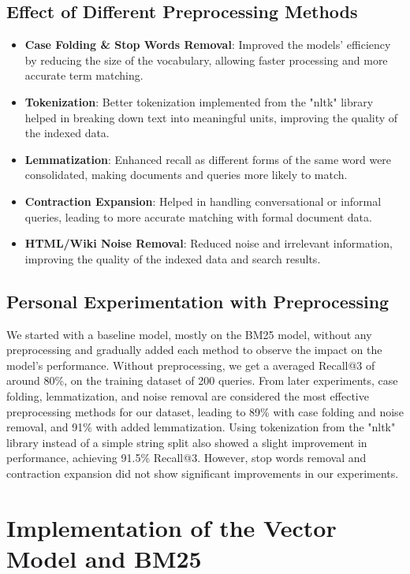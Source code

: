 \documentclass[12pt,letterpaper]{article}
\begin{document}
\subsection{Effect of Different Preprocessing Methods}
\begin{itemize}
    \item \textbf{Case Folding \& Stop Words Removal}: Improved the models' efficiency by reducing the size of the vocabulary, allowing faster processing and more accurate term matching.
    \item \textbf{Tokenization}: Better tokenization implemented from the "nltk" library helped in breaking down text into meaningful units, improving the quality of the indexed data.
    \item \textbf{Lemmatization}: Enhanced recall as different forms of the same word were consolidated, making documents and queries more likely to match.
    \item \textbf{Contraction Expansion}: Helped in handling conversational or informal queries, leading to more accurate matching with formal document data.
    \item \textbf{HTML/Wiki Noise Removal}: Reduced noise and irrelevant information, improving the quality of the indexed data and search results.
\end{itemize}

\subsection{Personal Experimentation with Preprocessing}
We started with a baseline model, mostly on the BM25 model, without any preprocessing and gradually added each method to observe the impact on the model's performance. Without preprocessing, we get a averaged Recall@3 of around 80\%, on the training dataset of 200 queries.
From later experiments, case folding, lemmatization, and noise removal are considered the most effective preprocessing methods for our dataset, leading to 89\% with case folding and noise removal, and 91\% with added lemmatization. Using tokenization from the "nltk" library instead of a simple string split also showed a slight improvement in performance, achieving 91.5\% Recall@3.
However, stop words removal and contraction expansion did not show significant improvements in our experiments.

\section{Implementation of the Vector Model and BM25}
\end{document}
